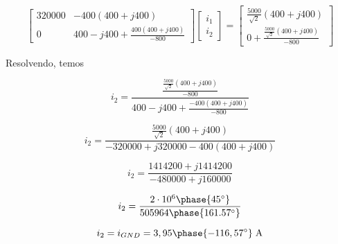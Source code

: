 \[
    \begin{bmatrix}
        320000 & - 400    (400 + j400)    \\
        0      & 400 - j400 + \frac{400(400 + j400)}{-800}
    \end{bmatrix}
    \begin{bmatrix}
        i_1 \\
        i_2
    \end{bmatrix}
    =
    \begin{bmatrix}
        \frac{5000}{\sqrt{2}} (400 + j400) \\
        0 + \frac{\frac{5000}{\sqrt{2}} (400 + j400)}{-800}
    \end{bmatrix}
\]

\endgroup

Resolvendo, temos

\[ i_2 = \frac{\frac{\frac{5000}{\sqrt{2}} (400 + j400)}{-800}}{400 - j400 + \frac{- 400(400 + j400)}{-800}} \]

\[ i_2 = \frac{\frac{5000}{\sqrt{2}} (400 + j400)}{-320000 + j320000 - 400(400 + j400)} \]

\[ i_2 = \frac{1414200 + j1414200}{-480000 + j160000} \]

\[ i_2 = \frac{2\cdot10^6\phase{45^{\circ}}}{505964\phase{161.57^{\circ}}} \]

\begin{equation}\label{eq:9.69.4}
    i_2 = i_{GND} = 3,95\phase{-116,57^{\circ}} \; \textrm{A}
\end{equation}


    























